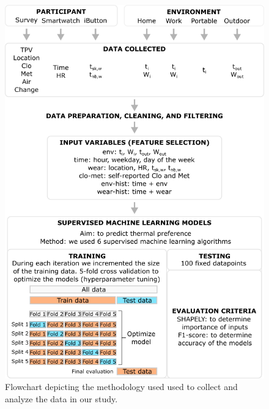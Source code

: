 \documentclass[]{article}
\begin{document}


\begin{figure}[thbp!]
    \centering
    \includegraphics[width=\textwidth]{figures/figure_a2}
    \caption{Flowchart depicting the methodology used used to collect and analyze the data in our study.}
    \label{fig:flowchart}
\end{figure}
\end{document}
